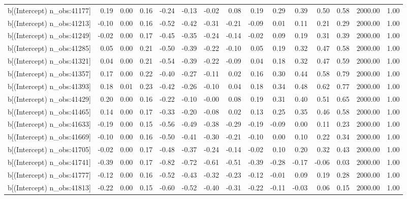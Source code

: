 \begin{table}[ht]
\begin{tabular}{rrrrrrrrrrrrrrr}
  b[(Intercept) n\_obs:41177] & 0.19 & 0.00 & 0.16 & -0.24 & -0.13 & -0.02 & 0.08 & 0.19 & 0.29 & 0.39 & 0.50 & 0.58 & 2000.00 & 1.00 \\ 
  b[(Intercept) n\_obs:41213] & -0.10 & 0.00 & 0.16 & -0.52 & -0.42 & -0.31 & -0.21 & -0.09 & 0.01 & 0.11 & 0.21 & 0.29 & 2000.00 & 1.00 \\ 
  b[(Intercept) n\_obs:41249] & -0.02 & 0.00 & 0.17 & -0.45 & -0.35 & -0.24 & -0.14 & -0.02 & 0.09 & 0.19 & 0.31 & 0.39 & 2000.00 & 1.00 \\ 
  b[(Intercept) n\_obs:41285] & 0.05 & 0.00 & 0.21 & -0.50 & -0.39 & -0.22 & -0.10 & 0.05 & 0.19 & 0.32 & 0.47 & 0.58 & 2000.00 & 1.00 \\ 
  b[(Intercept) n\_obs:41321] & 0.04 & 0.00 & 0.21 & -0.54 & -0.39 & -0.22 & -0.09 & 0.04 & 0.18 & 0.32 & 0.47 & 0.59 & 2000.00 & 1.00 \\ 
  b[(Intercept) n\_obs:41357] & 0.17 & 0.00 & 0.22 & -0.40 & -0.27 & -0.11 & 0.02 & 0.16 & 0.30 & 0.44 & 0.58 & 0.79 & 2000.00 & 1.00 \\ 
  b[(Intercept) n\_obs:41393] & 0.18 & 0.01 & 0.23 & -0.42 & -0.26 & -0.10 & 0.04 & 0.18 & 0.34 & 0.48 & 0.62 & 0.77 & 2000.00 & 1.00 \\ 
  b[(Intercept) n\_obs:41429] & 0.20 & 0.00 & 0.16 & -0.22 & -0.10 & -0.00 & 0.08 & 0.19 & 0.31 & 0.40 & 0.51 & 0.65 & 2000.00 & 1.00 \\ 
  b[(Intercept) n\_obs:41465] & 0.14 & 0.00 & 0.17 & -0.33 & -0.20 & -0.08 & 0.02 & 0.13 & 0.25 & 0.35 & 0.46 & 0.58 & 2000.00 & 1.00 \\ 
  b[(Intercept) n\_obs:41633] & -0.19 & 0.00 & 0.15 & -0.56 & -0.49 & -0.38 & -0.29 & -0.19 & -0.09 & 0.00 & 0.11 & 0.23 & 2000.00 & 1.00 \\ 
  b[(Intercept) n\_obs:41669] & -0.10 & 0.00 & 0.16 & -0.50 & -0.41 & -0.30 & -0.21 & -0.10 & 0.00 & 0.10 & 0.22 & 0.34 & 2000.00 & 1.00 \\ 
  b[(Intercept) n\_obs:41705] & -0.02 & 0.00 & 0.17 & -0.48 & -0.37 & -0.24 & -0.14 & -0.02 & 0.10 & 0.20 & 0.32 & 0.43 & 2000.00 & 1.00 \\ 
  b[(Intercept) n\_obs:41741] & -0.39 & 0.00 & 0.17 & -0.82 & -0.72 & -0.61 & -0.51 & -0.39 & -0.28 & -0.17 & -0.06 & 0.03 & 2000.00 & 1.00 \\ 
  b[(Intercept) n\_obs:41777] & -0.12 & 0.00 & 0.16 & -0.52 & -0.43 & -0.32 & -0.23 & -0.12 & -0.01 & 0.09 & 0.19 & 0.28 & 2000.00 & 1.00 \\ 
  b[(Intercept) n\_obs:41813] & -0.22 & 0.00 & 0.15 & -0.60 & -0.52 & -0.40 & -0.31 & -0.22 & -0.11 & -0.03 & 0.06 & 0.15 & 2000.00 & 1.00 \\ 

\end{tabular}
\end{table}
